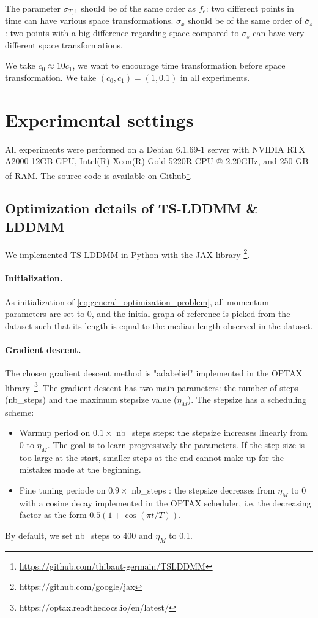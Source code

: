 The parameter $\sigma_{T,1}$ should be of the same order as $f_e$: two different points in time can have various space transformations.
 $\sigma_x$ should be of the same order of $\bar{\sigma}_s$: two points with a big difference regarding space compared to $\bar{\sigma}_s$ can have very different space transformations.

 We take $c_0\approx 10 c_1 $, we want to encourage time transformation before space transformation. We take $(c_0,c_1)=(1,0.1)$ in all experiments.


\section{Experimental settings}
\label{appendix:settings}
All experiments were performed on a Debian 6.1.69-1 server with NVIDIA RTX A2000 12GB GPU, Intel(R) Xeon(R) Gold 5220R CPU @ 2.20GHz, and 250 GB of RAM. The source code is available on Github\footnote{\url{https://github.com/thibaut-germain/TSLDDMM}}.

\subsection{Optimization details of TS-LDDMM \& LDDMM}
\label{appendix:optimizers_details}

We implemented TS-LDDMM in Python with the JAX library \footnote{https://github.com/google/jax}.

\paragraph{Initialization.}
As initialization of \eqref{eq:general_optimization_problem}, all momentum parameters are set to $0$, and the initial graph of reference is picked from the dataset such that its length is equal to the median length observed in the dataset.

\paragraph{Gradient descent.}
The chosen gradient descent method is "adabelief" \cite{zhuang2020adabelief} implemented in the OPTAX library~\footnote{https://optax.readthedocs.io/en/latest/}.
The gradient descent has two main parameters: the number of steps (nb\_steps) and the maximum stepsize value ($\eta_M$).
The stepsize has a scheduling scheme: 
\begin{itemize}
  \item Warmup period on $0.1 \times$ nb\_steps steps: the stepsize increases linearly from $0$ to $\eta_M$. The goal is to learn progressively the parameters. If the step size is too large at the start, smaller steps at the end cannot make up for the mistakes made at the beginning. 
  \item Fine tuning periode on $ 0.9  \times$ nb\_steps : the stepsize decreases from $\eta_M$ to $0$ with a cosine decay implemented in the OPTAX scheduler, i.e. the decreasing factor as the form $0.5  (1 + \cos(\pi  t/T))$. 
\end{itemize}
By default, we set nb\_steps to 400 and $\eta_M$ to 0.1.

